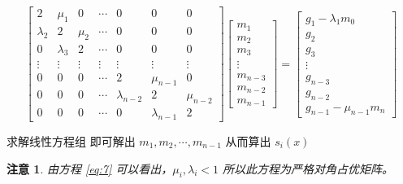 \documentclass{ctexart}
\newtheorem{attention}{注意}
\numberwithin{equation}{section}
\begin{document}
\begin{equation}
    \begin{bmatrix}
    2 & \mu_{1} & 0 & \cdots & 0 & 0 & 0 \\
    \lambda_{2} & 2 & \mu_{2} & \cdots & 0 & 0 & 0 \\
    0 & \lambda_{3} & 2 & \cdots & 0 & 0 & 0 \\
    \vdots & \vdots & \vdots & \vdots & \vdots & \vdots & \vdots \\
    0 & 0 & 0 & \cdots & 2 &  \mu_{n-1} & 0 \\
    0 & 0 & 0 & \cdots & \lambda_{n-2} & 2 & \mu_{n-2} \\
    0 & 0 & 0 & \cdots & 0 & \lambda_{n-1} & 2
\end{bmatrix}\begin{bmatrix}
    m_{1} \\
    m_{2} \\
    m_{3} \\
    \vdots \\
    m_{n-3} \\
    m_{n-2} \\
    m_{n-1}
\end{bmatrix}  = 
    \begin{bmatrix}
    g_{1}-\lambda_{1} m_0 \\
    g_{2} \\
    g_{3} \\
    \vdots \\
    g_{n-3} \\
    g_{n-2} \\
    g_{n-1}-\mu_{n-1} m_{n}
\end{bmatrix}
\label{eq:4}
\end{equation}

求解线性方程组  即可解出 $m_1,m_2,\cdots,m_{n-1}$ 从而算出 $s_i(x)$

\begin{attention}
    由方程 \ref{eq:7} 可以看出，$\mu_i,\lambda_i<1$ 所以此方程为严格对角占优矩阵。
\end{attention}
\end{document}
